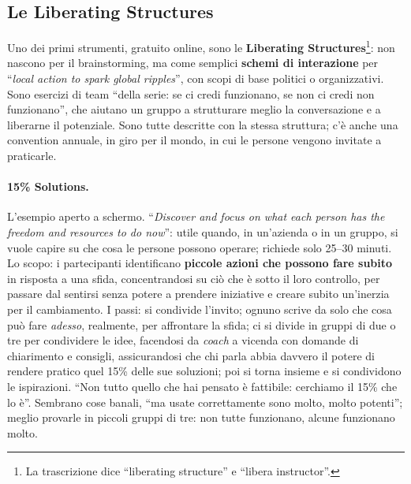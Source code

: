 \subsection{Le Liberating Structures}



Uno dei primi strumenti, gratuito online, sono le \textbf{Liberating
Structures}\footnote{La trascrizione dice ``liberating structure'' e ``libera
instructor''.}: non nascono per il brainstorming, ma come semplici \textbf{schemi di
interazione} per ``\emph{local action to spark global ripples}'', con scopi di base politici
o organizzativi. Sono esercizi di team ``della serie: se ci credi funzionano, se non ci credi
non funzionano'', che aiutano un gruppo a strutturare meglio la conversazione e a liberarne
il potenziale. Sono tutte descritte con la stessa struttura; c'è anche una convention
annuale, in giro per il mondo, in cui le persone vengono invitate a praticarle.

\paragraph{15\% Solutions.} L'esempio aperto a schermo. ``\emph{Discover and focus on what
each person has the freedom and resources to do now}'': utile quando, in un'azienda o in un
gruppo, si vuole capire su che cosa le persone possono operare; richiede solo 25--30
minuti. Lo scopo: i partecipanti identificano \textbf{piccole azioni che possono fare
subito} in risposta a una sfida, concentrandosi su ciò che è sotto il loro controllo, per
passare dal sentirsi senza potere a prendere iniziative e creare subito un'inerzia per il
cambiamento. I passi: si condivide l'invito; ognuno scrive da solo che cosa può fare
\emph{adesso}, realmente, per affrontare la sfida; ci si divide in gruppi di due o tre per
condividere le idee, facendosi da \emph{coach} a vicenda con domande di chiarimento e
consigli, assicurandosi che chi parla abbia davvero il potere di rendere pratico quel
15\% delle sue soluzioni; poi si torna insieme e si condividono le ispirazioni. ``Non tutto
quello che hai pensato è fattibile: cerchiamo il 15\% che lo è''. Sembrano cose banali,
``ma usate correttamente sono molto, molto potenti''; meglio provarle in piccoli gruppi
di tre: non tutte funzionano, alcune funzionano molto.

